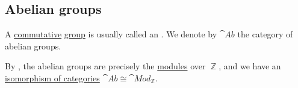 \subsection{Abelian groups}\label{subsec:abelian_groups}

\begin{definition}\label{def:abelian_group}
  A \hyperref[def:magma/commutative]{commutative} \hyperref[def:group]{group} is usually called an . We denote by \( \cat{Ab} \) the category of abelian groups.

  By , the abelian groups are precisely the \hyperref[def:module]{modules} over \( \BbbZ \), and we have an \hyperref[rem:category_similarity/isomorphism]{isomorphism of categories} \( \cat{Ab} \cong \cat{Mod}_\BbbZ \).
\end{definition}

